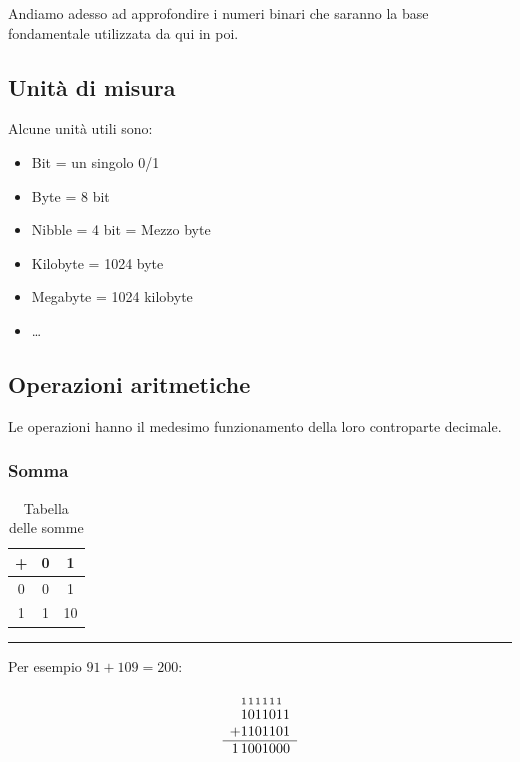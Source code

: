 \documentclass{article}
\begin{document}
Andiamo adesso ad approfondire i numeri binari che saranno la base fondamentale utilizzata da qui in poi.

\subsection{Unità di misura}

Alcune unità utili sono:

\begin{itemize}
    \item Bit = un singolo 0/1
    \item Byte = 8 bit
    \item Nibble = 4 bit = Mezzo byte
    \item Kilobyte = 1024 byte
    \item Megabyte = 1024 kilobyte
    \item \ldots
\end{itemize}

\subsection{Operazioni aritmetiche}

Le operazioni hanno il medesimo funzionamento della loro controparte decimale.

\subsubsection{Somma}

\begin{table}[ht]
    \centering
    \begin{tabular}{|c|c|c|}
        \hline
        + & 0 & 1\\
        \hline
        0 & 0 & 1\\
        \hline
        1 & 1 & 10\\
        \hline
    \end{tabular}
    \caption{Tabella delle somme}
    \label{tab:sum_tab}
\end{table}

\vspace{5pt}

\noindent\rule{\textwidth}{0.5pt}

\noindent Per esempio $91+109=200$:

\[
\begin{array}{c@{}c@{}c@{}c@{}c@{}c@{}c@{}c}
   & _1 & _1 & _1 & _1 & _1 & _1 &   \\
   & 1 & 0 & 1 & 1 & 0 & 1 & 1 \\
+  & 1 & 1 & 0 & 1 & 1 & 0 & 1 \\
\hline
   1 & 1 & 0 & 0 & 1 & 0 & 0 & 0 \\
\end{array}
\]
\end{document}
